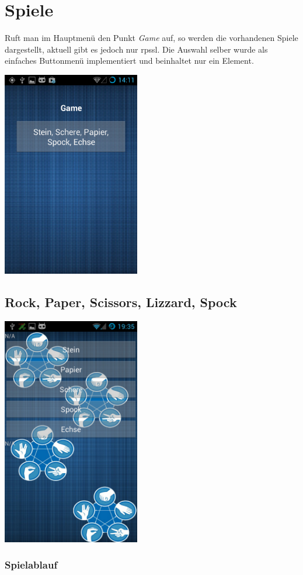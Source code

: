 \section{Spiele}
Ruft man im Hauptmenü den Punkt \textit{Game} auf, so werden die vorhandenen Spiele dargestellt, aktuell gibt es jedoch nur \gls{rpssl}. Die Auswahl selber wurde als einfaches Buttonmenü implementiert und beinhaltet nur ein Element.
\begin{capfigure}
	\includegraphics[width=6cm]{images/app/gamelist}
\end{capfigure}


\subsection{Rock, Paper, Scissors, Lizzard, Spock}

\begin{capfigure}
	\includegraphics[width=6cm]{images/app/rpssl}
\end{capfigure}



\subsubsection{Spielablauf}

